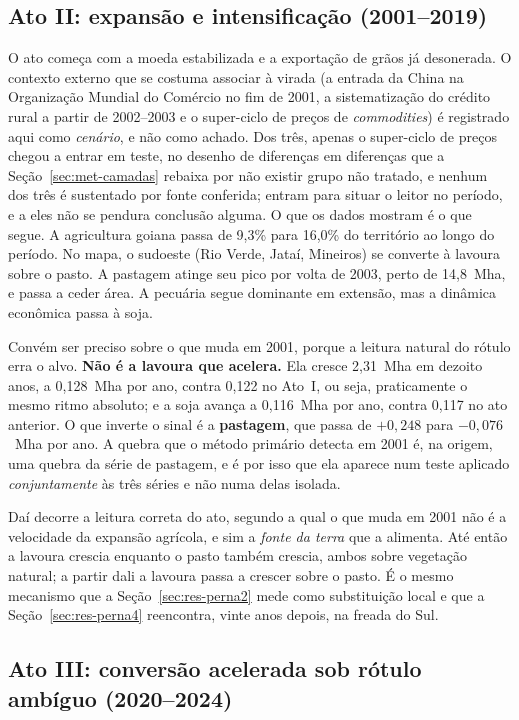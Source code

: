 \subsection{Ato II: expansão e intensificação (2001--2019)}

O ato começa com a moeda estabilizada e a exportação de grãos já
desonerada. O contexto externo que se costuma associar à virada (a entrada
da China na Organização Mundial do Comércio no fim de 2001, a sistematização
do crédito rural a partir de 2002--2003 e o super-ciclo de preços de
\emph{commodities}) é registrado aqui como \emph{cenário}, e não como achado. Dos
três, apenas o super-ciclo de preços chegou a entrar em teste, no desenho de
diferenças em diferenças que a Seção~\ref{sec:met-camadas} rebaixa por não
existir grupo não tratado, e nenhum dos três é sustentado por fonte
conferida; entram para situar o leitor no período, e a eles não se pendura
conclusão alguma. O que os dados mostram é o que segue. A agricultura
goiana passa de 9,3\% para 16,0\% do território ao longo do período. No
mapa, o sudoeste (Rio Verde, Jataí, Mineiros) se converte à lavoura
sobre o pasto. A pastagem atinge seu pico por volta de 2003, perto de
14,8~Mha, e passa a ceder área. A pecuária segue dominante em extensão, mas
a dinâmica econômica passa à soja.

Convém ser preciso sobre o que muda em 2001, porque a leitura natural do rótulo
erra o alvo. \textbf{Não é a lavoura que acelera.} Ela cresce 2,31~Mha em
dezoito anos, a 0,128~Mha por ano, contra 0,122 no Ato~I, ou seja, praticamente o
mesmo ritmo absoluto; e a soja avança a 0,116~Mha por ano, contra 0,117 no ato
anterior. O que inverte o sinal é a \textbf{pastagem}, que passa de
$+0{,}248$ para $-0{,}076$~Mha por ano. A quebra que o método primário detecta
em 2001 é, na origem, uma quebra da série de pastagem, e é por isso que ela
aparece num teste aplicado \emph{conjuntamente} às três séries e não numa delas
isolada.

Daí decorre a leitura correta do ato, segundo a qual o que muda em 2001 não é a velocidade da
expansão agrícola, e sim a \emph{fonte da terra} que a alimenta. Até então a
lavoura crescia enquanto o pasto também crescia, ambos sobre vegetação natural;
a partir dali a lavoura passa a crescer sobre o pasto. É o mesmo mecanismo que
a Seção~\ref{sec:res-perna2} mede como substituição local e que a
Seção~\ref{sec:res-perna4} reencontra, vinte anos depois, na freada do Sul.

\subsection{Ato III: conversão acelerada sob rótulo ambíguo (2020--2024)}

